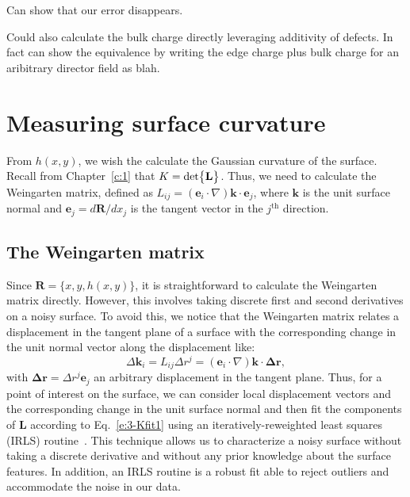 Can show that our error disappears.


Could also calculate the bulk charge directly leveraging additivity of defects. In fact can show the equivalence by writing the edge charge plus bulk charge for an aribitrary director field as blah.




\section{Measuring surface curvature}
From $h(x,y)$, we wish the calculate the Gaussian curvature of the surface.
Recall from Chapter~\ref{c:1} that $K = \textup{det} \big \{ \mathbf{L} \big \}$.
Thus, we need to calculate the Weingarten matrix, defined as $L_{ij} = (\mathbf{e}_i \cdot \nabla) \mathbf{k} \cdot \mathbf{e}_j$, where $\mathbf{k}$ is the unit surface normal and $\mathbf{e}_j = d \mathbf{R}/dx_j$ is the tangent vector in the $j^{\textrm{th}}$ direction.


\subsection{The Weingarten matrix}
Since $\mathbf{R} = \{x, y, h(x,y)\}$, it is straightforward to calculate the Weingarten matrix directly.
However, this involves taking discrete first and second derivatives on a noisy surface.
To avoid this, we notice that the Weingarten matrix relates a displacement in the tangent plane of a surface with the corresponding change in the unit normal vector along the displacement like:
\begin{equation}
\Delta \mathbf{k}_i = L_{ij} \Delta r^j = (\mathbf{e}_i \cdot \nabla) \mathbf{k} \cdot \mathbf{\Delta r},\label{e:3-Kfit1}
\end{equation}
with $\mathbf{\Delta r} = \Delta r^j \mathbf{e}_j$ an arbitrary displacement in the tangent plane.
Thus, for a point of interest on the surface, we can consider local displacement vectors and the corresponding change in the unit surface normal and then fit the components of $\mathbf{L}$ according to Eq.~\ref{e:3-Kfit1} using an iteratively-reweighted least squares (IRLS) routine~\cite{RN32,RN31}.
This technique allows us to characterize a noisy surface without taking a discrete derivative and without any prior knowledge about the surface features.
In addition, an IRLS routine is a robust fit able to reject  outliers and accommodate the noise in our data.


